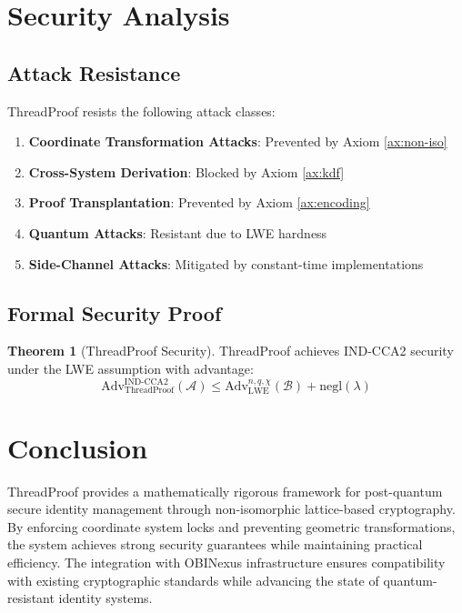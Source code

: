 \documentclass[11pt]{article}
\theoremstyle{definition}
\newtheorem{theorem}{Theorem}[section]
\begin{document}
\section{Security Analysis}

\subsection{Attack Resistance}

ThreadProof resists the following attack classes:

\begin{enumerate}
  \item \textbf{Coordinate Transformation Attacks}: Prevented by Axiom \ref{ax:non-iso}
  \item \textbf{Cross-System Derivation}: Blocked by Axiom \ref{ax:kdf}
  \item \textbf{Proof Transplantation}: Prevented by Axiom \ref{ax:encoding}
  \item \textbf{Quantum Attacks}: Resistant due to LWE hardness
  \item \textbf{Side-Channel Attacks}: Mitigated by constant-time implementations
\end{enumerate}

\subsection{Formal Security Proof}

\begin{theorem}[ThreadProof Security]
ThreadProof achieves IND-CCA2 security under the LWE assumption with advantage:
$$\text{Adv}_{\text{ThreadProof}}^{\text{IND-CCA2}}(\mathcal{A}) \leq \text{Adv}_{\text{LWE}}^{n,q,\chi}(\mathcal{B}) + \text{negl}(\lambda)$$
\end{theorem}

\section{Conclusion}

ThreadProof provides a mathematically rigorous framework for post-quantum secure identity management through non-isomorphic lattice-based cryptography. By enforcing coordinate system locks and preventing geometric transformations, the system achieves strong security guarantees while maintaining practical efficiency. The integration with OBINexus infrastructure ensures compatibility with existing cryptographic standards while advancing the state of quantum-resistant identity systems.
\end{document}
